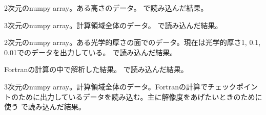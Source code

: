 \documentclass[letterpaper,10pt,dvipdfmx,report]{sphinxmanual}
\begin{document}

\begin{fulllineitems}
\label{\detokenize{io:R2D2.R2D2.q2}}
2次元のnumpy array。ある高さのデータ。 で読み込んだ結果。

\end{fulllineitems}


\begin{fulllineitems}
\label{\detokenize{io:R2D2.R2D2.q3}}
3次元のnumpy array。計算領域全体のデータ。 で読み込んだ結果。

\end{fulllineitems}


\begin{fulllineitems}
\label{\detokenize{io:R2D2.R2D2.qi}}
2次元のnumpy array。ある光学的厚さの面でのデータ。現在は光学的厚さ1, 0.1, 0.01でのデータを出力している。  で読み込んだ結果。

\end{fulllineitems}


\begin{fulllineitems}
\label{\detokenize{io:R2D2.R2D2.vc}}
Fortranの計算の中で解析した結果。  で読み込んだ結果。

\end{fulllineitems}


\begin{fulllineitems}
\label{\detokenize{io:R2D2.R2D2.qc}}
3次元のnumpy array。計算領域全体のデータ。Fortranの計算でチェックポイントのために出力しているデータを読み込む。主に解像度をあげたいときのために使う  で読み込んだ結果。

\end{fulllineitems}
\end{document}
